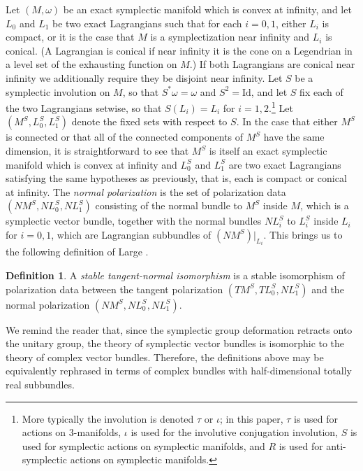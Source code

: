 \documentclass[11pt,reqno]{amsart}
\theoremstyle{definition}
\newtheorem{define}[thm]{Definition}
\theoremstyle{remark}
\numberwithin{equation}{section}
\begin{document}
Let $(M,\omega)$ be an exact symplectic manifold which is convex at infinity, and let $L_0$ and $L_1$ be two exact Lagrangians such that for each $i=0,1$, either $L_i$ is compact, or it is the case that $M$ is a symplectization near infinity and $L_i$ is conical. (A Lagrangian is conical if near infinity it is the cone on a Legendrian in a level set of the exhausting function on $M$.) If both Lagrangians are conical near infinity we additionally require they be disjoint near infinity. Let $S$ be a symplectic involution on $M$, so that $S^*\omega = \omega$ and $S^2= \mathrm{Id}$, and let $S$ fix each of the two Lagrangians setwise, so that $S(L_i) = L_i$ for $i=1,2$.\footnote{More typically the involution is denoted $\tau$ or $\iota$; in this paper, $\tau$ is used for actions on $3$-manifolds, $\iota$ is used for the involutive conjugation involution, $S$ is used for symplectic actions on symplectic manifolds, and $R$ is used for anti-symplectic actions on symplectic manifolds.} Let $(M^S, L_0^S, L_1^S)$ denote the fixed sets with respect to $S$. In the case that either $M^S$ is connected or that all of the connected components of $M^S$ have the same dimension, it is straightforward to see that $M^S$ is itself an exact symplectic manifold which is convex at infinity and $L_0^S$ and $L_1^S$ are two exact Lagrangians satisfying the same hypotheses as previously, that is, each is compact or conical at infinity. The \emph{normal polarization} is the set of polarization data $(NM^S, NL_0^S, NL_1^S)$ consisting of the normal bundle to $M^S$ inside $M$, which is a symplectic vector bundle, together with the normal bundles $NL_i^S$ to $L_i^S$ inside $L_i$ for $i=0,1$, which are Lagrangian subbundles of $(NM^S)|_{L_i}$. This brings us to the following definition of Large \cite{Large}.
 

\begin{define} \label{def:stable-normal} A \emph{stable tangent-normal isomorphism} is a stable isomorphism of polarization data between the tangent polarization $(TM^{S}, TL_0^{S}, NL_1^{S})$ and the normal polarization $(NM^{S}, NL_0^{S}, NL_1^{S})$. \end{define}

We remind the reader that, since the symplectic group deformation retracts onto the unitary group, the theory of symplectic vector bundles is isomorphic to the theory of complex vector bundles. Therefore, the definitions above may be equivalently rephrased in terms of complex bundles with half-dimensional totally real subbundles.
\end{document}
